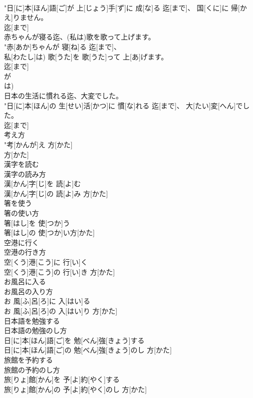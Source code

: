 \documentclass[8pt]{extreport}
\begin{document}
\begin{CJK}{UTF8}{min}
\\	"日[に]本[ほん]語[ご]が 上[じょう]手[ず]に 成[な]る 迄[まで]、 国[くに]に 帰[かえ]りません。 
\\	迄[まで]
\\	赤ちゃんが寝る迄、(私は)歌を歌って上げます。	
\\	"赤[あか]ちゃんが 寝[ね]る 迄[まで]、
\\	私[わたし]は) 歌[うた]を 歌[うた]って 上[あ]げます。 
\\	迄[まで]
\\	が 
\\	は)
\\	日本の生活に慣れる迄、大変でした。	
\\	"日[に]本[ほん]の 生[せい]活[かつ]に 慣[な]れる 迄[まで]、 大[たい]変[へん]でした。
\\	迄[まで]
\\	考え方	
\\	"考[かんが]え 方[かた] 
\\	方[かた] 
\\	漢字を読む 
\\	漢字の読み方	
\\	漢[かん]字[じ]を 読[よ]む 
\\	漢[かん]字[じ]の 読[よ]み 方[かた]
\\	箸を使う 
\\	箸の使い方	
\\	箸[はし]を 使[つか]う 
\\	箸[はし]の 使[つか]い方[かた]
\\	空港に行く 
\\	空港の行き方	
\\	空[くう]港[こう]に 行[い]く 
\\	空[くう]港[こう]の 行[い]き 方[かた]
\\	お風呂に入る 
\\	お風呂の入り方	
\\	お 風[ふ]呂[ろ]に 入[はい]る 
\\	お 風[ふ]呂[ろ]の 入[はい]り 方[かた]
\\	日本語を勉強する 
\\	日本語の勉強のし方	
\\	日[に]本[ほん]語[ご]を 勉[べん]強[きょう]する 
\\	日[に]本[ほん]語[ご]の 勉[べん]強[きょう]のし 方[かた]
\\	旅館を予約する 
\\	旅館の予約のし方	
\\	旅[りょ]館[かん]を 予[よ]約[やく]する 
\\	旅[りょ]館[かん]の 予[よ]約[やく]のし 方[かた]

\end{CJK}
\end{document}
